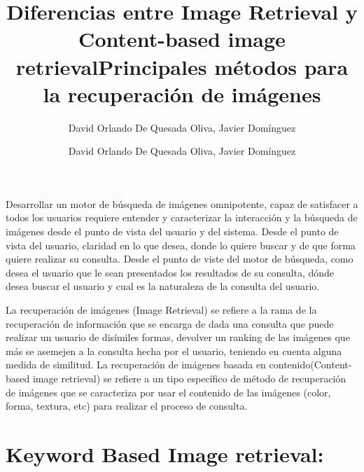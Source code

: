 \documentclass{llncs}
\begin{document}
Desarrollar un motor de búsqueda de imágenes omnipotente, capaz de satisfacer a todos los usuarios 
requiere entender y caracterizar la interacción y la búsqueda de imágenes desde el punto de vista 
del usuario y del sistema. Desde el punto de vista del usuario, claridad en lo que desea, donde lo 
quiere buscar y de que forma quiere realizar su consulta. Desde el punto de viste del motor de 
búsqueda, como desea el usuario que le sean presentados los resultados de su consulta, dónde desea 
buscar el usuario y cual es la naturaleza de la consulta del usuario.


\newpage
\title{Diferencias entre Image Retrieval y Content-based image retrieval}
\author{David Orlando De Quesada Oliva, Javier Dom\'inguez}
\maketitle


La recuperación de imágenes (Image Retrieval) se refiere a la rama de la recuperación de información que se encarga 
de dada una consulta que puede realizar un usuario de disímiles formas, devolver un ranking de las imágenes que más 
se asemejen a la consulta hecha por el usuario, teniendo en cuenta alguna medida de similitud. La recuperación de 
imágenes basada en contenido(Content-based image retrieval) se refiere a un tipo específico de método de recuperación de 
imágenes que se  caracteriza por usar el contenido de las imágenes (color, forma, textura, etc) para realizar el proceso 
de consulta.

\newpage
\title{Principales m\'etodos para la recuperaci\'on de im\'agenes}
\author{David Orlando De Quesada Oliva, Javier Dom\'inguez}
\maketitle

\section*{Keyword Based Image retrieval:}
\end{document}
